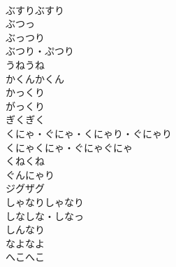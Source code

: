 \documentclass[8pt]{extreport}
\begin{document}
\begin{CJK}{UTF8}{min}
\\	ぶすりぶすり	
\\	ぶつっ	
\\	ぶっつり	
\\	ぶつり・ぷつり	
\\	うねうね	
\\	かくんかくん	
\\	かっくり	
\\	がっくり	
\\	ぎくぎく	
\\	くにゃ・ぐにゃ・くにゃり・ぐにゃり	
\\	くにゃくにゃ・ぐにゃぐにゃ	
\\	くねくね	
\\	ぐんにゃり	
\\	ジグザグ	
\\	しゃなりしゃなり	
\\	しなしな・しなっ	
\\	しんなり	
\\	なよなよ	
\\	へこへこ	
\end{CJK}
\end{document}
